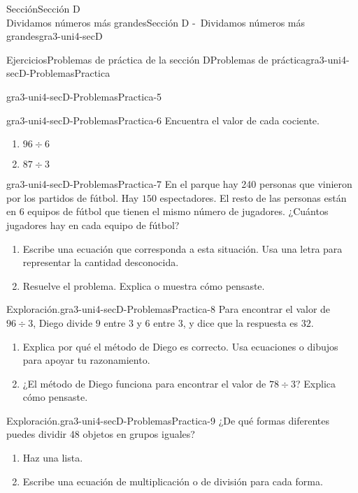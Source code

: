 \begin{sectionptx}{Sección}{{\Large Sección D\\}Dividamos números más grandes}{}{Sección D -~Dividamos números más grandes}{}{}{gra3-uni4-secD}
\begin{exercises-subsection}{Ejercicios}{Problemas de práctica de la sección D}{}{Problemas de práctica}{}{}{gra3-uni4-secD-ProblemasPractica}
\begin{divisionexercise}{3}{}{}{gra3-uni4-secD-ProblemasPractica-5}
\begin{enumerate}[label={(\alph*)}]
\end{enumerate}
\end{divisionexercise}%
\begin{divisionexercise}{4}{}{}{gra3-uni4-secD-ProblemasPractica-6}%
Encuentra el valor de cada cociente.%
%
\begin{enumerate}[label={(\alph*)}]
\item{}\(\displaystyle 96 \div 6\)%
\item{}\(\displaystyle 87 \div 3\)%
\end{enumerate}
\end{divisionexercise}%
\begin{divisionexercise}{5}{}{}{gra3-uni4-secD-ProblemasPractica-7}%
En el parque hay 240 personas que vinieron por los partidos de fútbol. Hay \(150\) espectadores. El resto de las personas están en \(6\) equipos de fútbol que tienen el mismo número de jugadores. ¿Cuántos jugadores hay en cada equipo de fútbol?%
%
\begin{enumerate}[label={(\alph*)}]
\item{}Escribe una ecuación que corresponda a esta situación. Usa una letra para representar la cantidad desconocida.%
\item{}Resuelve el problema. Explica o muestra cómo pensaste.%
\end{enumerate}
\end{divisionexercise}%
\begin{divisionexercise}{6}{Exploración.}{}{gra3-uni4-secD-ProblemasPractica-8}%
Para encontrar el valor de \(96 \div 3\), Diego divide \(9\) entre \(3\) y \(6\) entre \(3\), y dice que la respuesta es \(32\).%
%
\begin{enumerate}[label={(\alph*)}]
\item{}Explica por qué el método de Diego es correcto. Usa ecuaciones o dibujos para apoyar tu razonamiento.%
\item{}¿El método de Diego funciona para encontrar el valor de \(78 \div 3\)? Explica cómo pensaste.%
\end{enumerate}
\end{divisionexercise}%
\begin{divisionexercise}{7}{Exploración.}{}{gra3-uni4-secD-ProblemasPractica-9}%
¿De qué formas diferentes puedes dividir 48 objetos en grupos iguales?%
%
\begin{enumerate}[label={(\alph*)}]
\item{}Haz una lista.%
\item{}Escribe una ecuación de multiplicación o de división para cada forma.%

\end{enumerate}
\end{divisionexercise}
\end{exercises-subsection}
\end{sectionptx}
